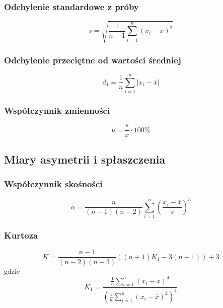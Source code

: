 \documentclass[12pt]{article}
\begin{document}
		\subsubsection{Odchylenie standardowe z próby}
			\[
				s = \sqrt{\frac{1}{n-1} \sum_{i=1}^{n}(x_i - \overline{x})^2}
			\]
		\subsubsection{Odchylenie przeciętne od wartości średniej}
			\[
				d_1 = \frac{1}{n} \sum_{i=1}^{n}|x_i-\overline{x}|
			\]
		\subsubsection{Współczynnik zmienności}
			\[
				\nu = \frac{s}{\overline{x}}\cdot 100\%
			\]
	\subsection{Miary asymetrii i spłaszczenia}
		\subsubsection{Współczynnik skośności}
			\[
				\alpha = \frac{n}{(n-1)(n-2)}\sum_{i=1}^{n}\left(\frac{x_i-\overline{x}}{s}\right)^3
			\]
		\subsubsection{Kurtoza}
			\[
				K = \frac{n-1}{(n-2)(n-3)}((n+1)K_1-3(n-1)) + 3
			\]
			gdzie
			\[
				K_1 = \frac{\frac{1}{n}\sum\limits_{i=1}^{n}(x_i-\overline{x})^4}{\left(\frac{1}{n}\sum\limits_{i=1}^{n}(x_i-\overline{x})^2\right)^4}
			\]
\end{document}
